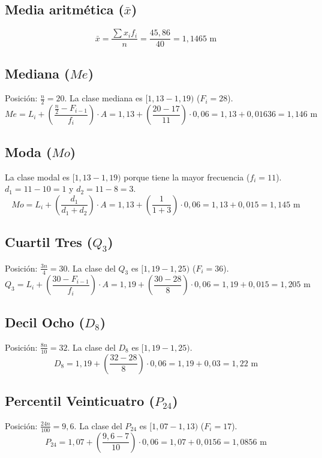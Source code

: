 \documentclass[12pt, a4paper]{article}
\begin{document}
\subsection*{Media aritmética ($\bar{x}$)}
\[ \bar{x} = \frac{\sum x_i f_i}{n} = \frac{45,86}{40} = 1,1465 \text{ m} \]

\subsection*{Mediana ($Me$)}
Posición: $\frac{n}{2} = 20$. La clase mediana es $[1,13 - 1,19)$ ($F_i = 28$).
\[ Me = L_i + \left( \frac{\frac{n}{2} - F_{i-1}}{f_i} \right) \cdot A = 1,13 + \left( \frac{20 - 17}{11} \right) \cdot 0,06 = 1,13 + 0,01636 = 1,146 \text{ m} \]

\subsection*{Moda ($Mo$)}
La clase modal es $[1,13 - 1,19)$ porque tiene la mayor frecuencia ($f_i = 11$).
$d_1 = 11 - 10 = 1$ y $d_2 = 11 - 8 = 3$.
\[ Mo = L_i + \left( \frac{d_1}{d_1 + d_2} \right) \cdot A = 1,13 + \left( \frac{1}{1 + 3} \right) \cdot 0,06 = 1,13 + 0,015 = 1,145 \text{ m} \]

\subsection*{Cuartil Tres ($Q_3$)}
Posición: $\frac{3n}{4} = 30$. La clase del $Q_3$ es $[1,19 - 1,25)$ ($F_i = 36$).
\[ Q_3 = L_i + \left( \frac{30 - F_{i-1}}{f_i} \right) \cdot A = 1,19 + \left( \frac{30 - 28}{8} \right) \cdot 0,06 = 1,19 + 0,015 = 1,205 \text{ m} \]

\subsection*{Decil Ocho ($D_8$)}
Posición: $\frac{8n}{10} = 32$. La clase del $D_8$ es $[1,19 - 1,25)$.
\[ D_8 = 1,19 + \left( \frac{32 - 28}{8} \right) \cdot 0,06 = 1,19 + 0,03 = 1,22 \text{ m} \]

\subsection*{Percentil Veinticuatro ($P_{24}$)}
Posición: $\frac{24n}{100} = 9,6$. La clase del $P_{24}$ es $[1,07 - 1,13)$ ($F_i = 17$).
\[ P_{24} = 1,07 + \left( \frac{9,6 - 7}{10} \right) \cdot 0,06 = 1,07 + 0,0156 = 1,0856 \text{ m} \]
\end{document}
